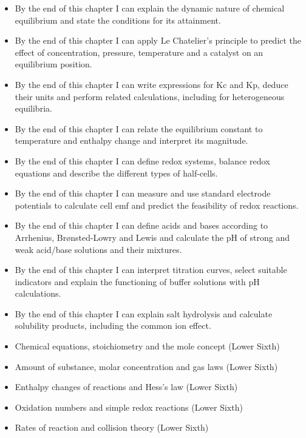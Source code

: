 \documentclass[11pt]{article}
\begin{document}
\begin{objectifs}
\begin{itemize}
\item By the end of this chapter I can explain the dynamic nature of chemical equilibrium and state the conditions for its attainment.
\item By the end of this chapter I can apply Le Chatelier's principle to predict the effect of concentration, pressure, temperature and a catalyst on an equilibrium position.
\item By the end of this chapter I can write expressions for Kc and Kp, deduce their units and perform related calculations, including for heterogeneous equilibria.
\item By the end of this chapter I can relate the equilibrium constant to temperature and enthalpy change and interpret its magnitude.
\item By the end of this chapter I can define redox systems, balance redox equations and describe the different types of half-cells.
\item By the end of this chapter I can measure and use standard electrode potentials to calculate cell emf and predict the feasibility of redox reactions.
\item By the end of this chapter I can define acids and bases according to Arrhenius, Brønsted-Lowry and Lewis and calculate the pH of strong and weak acid/base solutions and their mixtures.
\item By the end of this chapter I can interpret titration curves, select suitable indicators and explain the functioning of buffer solutions with pH calculations.
\item By the end of this chapter I can explain salt hydrolysis and calculate solubility products, including the common ion effect.
\end{itemize}
\end{objectifs}

\begin{prerequis}
\begin{itemize}
\item Chemical equations, stoichiometry and the mole concept (Lower Sixth)
\item Amount of substance, molar concentration and gas laws (Lower Sixth)
\item Enthalpy changes of reactions and Hess's law (Lower Sixth)
\item Oxidation numbers and simple redox reactions (Lower Sixth)
\item Rates of reaction and collision theory (Lower Sixth)
\end{itemize}
\end{prerequis}
\end{document}
